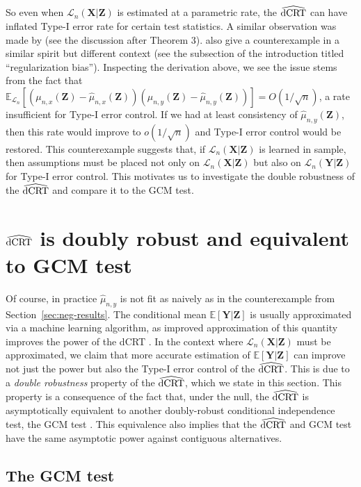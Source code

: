 \documentclass[12pt]{article}
\theoremstyle{definition}
\theoremstyle{remark}
\newcommand{\E}{\mathbb E}								%
\newcommand{\prx}{\bm X}								%
\newcommand{\prz}{\bm Z}								%
\newcommand{\pry}{{\bm Y}}								%
\newcommand{\law}{\mathcal L}							%
\newcommand{\dCRThat}{\widehat{\textnormal{dCRT}}}		%
\begin{document}
	So even when $\law_n(\prx|\prz)$ is estimated at a parametric rate,  the $\dCRThat$ can have inflated Type-I error rate for certain test statistics. A similar observation was made by \citet{Li2022} (see the discussion after Theorem 3). \citet{Chernozhukov2018} also give a counterexample in a similar spirit but different context  (see the subsection of the introduction titled ``regularization bias''). Inspecting the derivation above, we see the issue stems from the fact that $\E_{\law_n}[(\mu_{n,x}(\prz) - \widehat \mu_{n,x}(\prz))(\mu_{n,y}(\prz) - \widehat \mu_{n,y}(\prz))] = O(1/\sqrt{n})$, a rate insufficient for Type-I error control. If we had at least consistency of $\widehat \mu_{n,y}(\prz)$, then this rate would improve to $o(1/\sqrt{n})$ and Type-I error control would be restored. This counterexample suggests that, if $\law_n(\prx|\prz)$ is learned in sample, then assumptions must be placed not only on $\law_n(\prx|\prz)$ but also on $\law_n(\pry|\prz)$ for Type-I error control. This motivates us to investigate the double robustness of the $\dCRThat$ and compare it to the GCM test.
	
	
	\section{$\dCRThat$ is doubly robust and equivalent to GCM test} \label{sec:dr-and-equivalence}
	
	Of course, in practice $\widehat \mu_{n,y}$ is not fit as naively as in the counterexample from Section~\ref{sec:neg-results}. The conditional mean $\E[\pry|\prz]$ is usually approximated via a machine learning algorithm, as improved approximation of this quantity improves the power of the dCRT \citep{Katsevich2020a}. In the context where $\law_n(\prx|\prz)$ must be approximated, we claim that more accurate estimation of $\E[\pry|\prz]$ can improve not just the power but also the Type-I error control of the $\dCRThat$. This is due to a \textit{double robustness} property of the $\dCRThat$, which we state in this section. This property is a consequence of the fact that, under the null, the $\dCRThat$ is asymptotically equivalent to another doubly-robust conditional independence test, the GCM test \citep{Shah2018}. This equivalence also implies that the $\dCRThat$ and GCM test have the same asymptotic power against contiguous alternatives.
	
	\subsection{The GCM test}
	
\end{document}
